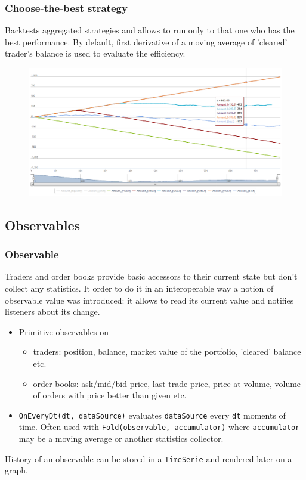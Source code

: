 \documentclass{beamer}
\begin{document}
\begin{frame}
\frametitle{Choose-the-best strategy}
Backtests aggregated strategies and allows to run only to that one who has the best performance. By default, first derivative of a moving average of 'cleared' trader's balance is used to evaluate the efficiency.
\begin{figure}[htbp]
\centering
\includegraphics[width=1\linewidth]{choosethebest.png}
\end{figure}
\end{frame}
\subsection{Observables}
\begin{frame}
\frametitle{Observable}
Traders and order books provide basic accessors to their current state but don't collect any statistics. It order to do it in an interoperable way a notion of observable value was introduced: it allows to read its current value and notifies listeners about its change.
\begin{itemize}
    \item Primitive observables on
    \begin{itemize}
      \item traders: position, balance, market value of the portfolio, 'cleared' balance etc.
      \item order books: ask/mid/bid price, last trade price, price at volume, volume of orders with price better than given etc.
    \end{itemize}
    \item \texttt{OnEveryDt(dt, dataSource)} evaluates \texttt{dataSource} every \texttt{dt} moments of time. Often used with \texttt{Fold(observable, accumulator)} where \texttt{accumulator} may be a moving average or another statistics collector.
\end{itemize}
History of an observable can be stored in a \texttt{TimeSerie} and rendered later on a graph.
\end{frame}
\end{document}
